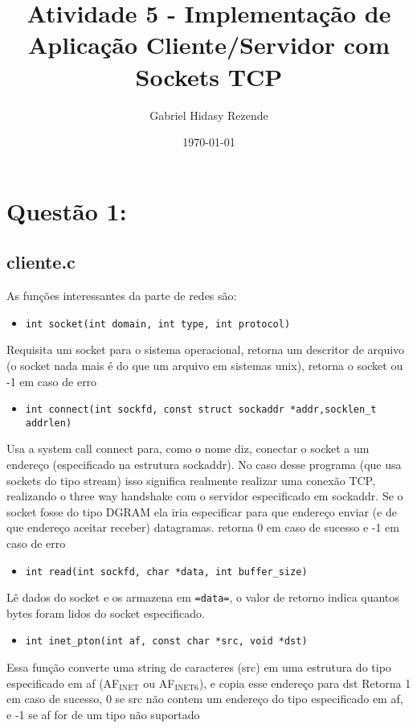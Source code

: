 \documentclass[11pt]{article}
\author{Gabriel Hidasy Rezende}
\date{\today}
\title{Atividade 5 - Implementação de Aplicação Cliente/Servidor com Sockets TCP}
\begin{document}
\maketitle

\section*{Questão 1:}
\label{sec-1}

\subsection*{cliente.c}
\label{sec-1-1}

As funções interessantes da parte de redes são:

\begin{itemize}
\item \texttt{int socket(int domain, int type, int protocol)}
\end{itemize}
Requisita um socket para o sistema operacional, retorna um descritor
de arquivo (o socket nada mais é do que um arquivo em sistemas unix),
retorna o socket ou -1 em caso de erro

\begin{itemize}
\item \texttt{int connect(int sockfd, const struct sockaddr *addr,socklen\_t addrlen)}
\end{itemize}
Usa a system call connect para, como o nome diz, conectar o socket a
um endereço (especificado na estrutura sockaddr).
No caso desse programa (que usa sockets do tipo stream) isso significa
realmente realizar uma conexão TCP, realizando o three way handshake
com o servidor especificado em sockaddr.
Se o socket fosse do tipo DGRAM ela iria especificar para que endereço
enviar (e de que endereço aceitar receber) datagramas.
retorna 0 em caso de sucesso e -1 em caso de erro

\begin{itemize}
\item \texttt{int read(int sockfd, char *data, int buffer\_size)}
\end{itemize}
Lê dados do socket e os armazena em \texttt{=data=}, o valor de retorno
indica quantos bytes foram lidos do socket especificado.

\begin{itemize}
\item \texttt{int inet\_pton(int af, const char *src, void *dst)}
\end{itemize}
Essa função converte uma string de caracteres (src) em uma estrutura
do tipo especificado em af (AF$_{\text{INET}}$ ou AF$_{\text{INET6}}$), e copia esse
endereço para dst
Retorna 1 em caso de sucesso, 0 se src não contem um endereço do tipo
especificado em af, e -1 se af for de um tipo não suportado
\end{document}
